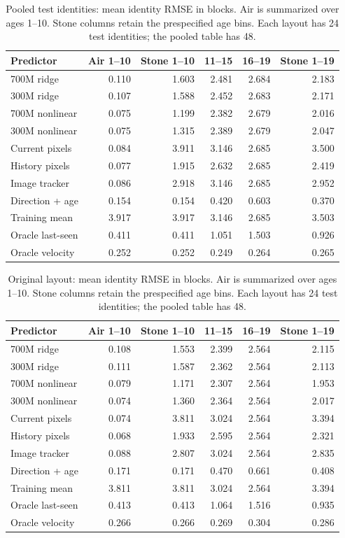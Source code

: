\begin{table}[!htbp]\centering\small
\caption{Pooled test identities: mean identity RMSE in blocks. Air is summarized over ages 1--10. Stone columns retain the prespecified age bins. Each layout has 24 test identities; the pooled table has 48.}
\begin{tabular}{@{}lrrrrr@{}}\toprule Predictor & Air 1--10 & Stone 1--10 & 11--15 & 16--19 & Stone 1--19\\\midrule
700M ridge & 0.110 & 1.603 & 2.481 & 2.684 & 2.183\\
300M ridge & 0.107 & 1.588 & 2.452 & 2.683 & 2.171\\
700M nonlinear & 0.075 & 1.199 & 2.382 & 2.679 & 2.016\\
300M nonlinear & 0.075 & 1.315 & 2.389 & 2.679 & 2.047\\
Current pixels & 0.084 & 3.911 & 3.146 & 2.685 & 3.500\\
History pixels & 0.077 & 1.915 & 2.632 & 2.685 & 2.419\\
Image tracker & 0.086 & 2.918 & 3.146 & 2.685 & 2.952\\
Direction + age & 0.154 & 0.154 & 0.420 & 0.603 & 0.370\\
Training mean & 3.917 & 3.917 & 3.146 & 2.685 & 3.503\\
Oracle last-seen & 0.411 & 0.411 & 1.051 & 1.503 & 0.926\\
Oracle velocity & 0.252 & 0.252 & 0.249 & 0.264 & 0.265\\
\bottomrule\end{tabular}\end{table}
\begin{table}[!htbp]\centering\small
\caption{Original layout: mean identity RMSE in blocks. Air is summarized over ages 1--10. Stone columns retain the prespecified age bins. Each layout has 24 test identities; the pooled table has 48.}
\begin{tabular}{@{}lrrrrr@{}}\toprule Predictor & Air 1--10 & Stone 1--10 & 11--15 & 16--19 & Stone 1--19\\\midrule
700M ridge & 0.108 & 1.553 & 2.399 & 2.564 & 2.115\\
300M ridge & 0.111 & 1.587 & 2.362 & 2.564 & 2.113\\
700M nonlinear & 0.079 & 1.171 & 2.307 & 2.564 & 1.953\\
300M nonlinear & 0.074 & 1.360 & 2.364 & 2.564 & 2.017\\
Current pixels & 0.074 & 3.811 & 3.024 & 2.564 & 3.394\\
History pixels & 0.068 & 1.933 & 2.595 & 2.564 & 2.321\\
Image tracker & 0.088 & 2.807 & 3.024 & 2.564 & 2.835\\
Direction + age & 0.171 & 0.171 & 0.470 & 0.661 & 0.408\\
Training mean & 3.811 & 3.811 & 3.024 & 2.564 & 3.394\\
Oracle last-seen & 0.413 & 0.413 & 1.064 & 1.516 & 0.935\\
Oracle velocity & 0.266 & 0.266 & 0.269 & 0.304 & 0.286\\
\bottomrule\end{tabular}\end{table}
